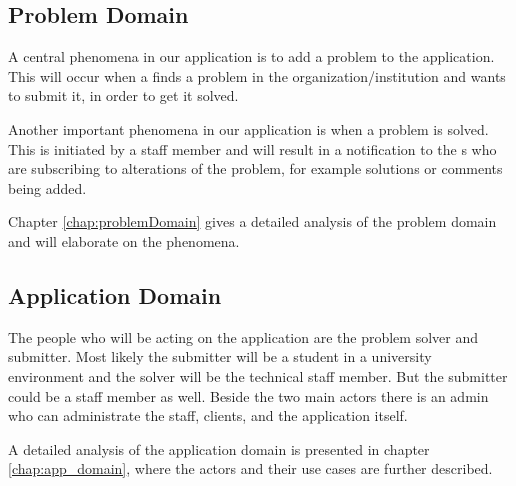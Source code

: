 \subsection{Problem Domain}
A central phenomena in our application is to add a problem to the application.
This will occur when a \aclient[] finds a problem in the organization/institution and wants to submit it, in order to get it solved.

Another important phenomena in our application is when a problem is solved.
This is initiated by a staff member and will result in a notification to the \aclient s who are subscribing to alterations of the problem, for example solutions or comments being added.

Chapter \ref{chap:problemDomain} gives a detailed analysis of the problem domain and will elaborate on the phenomena.

\subsection{Application Domain}
The people who will be acting on the application are the problem solver and submitter. Most likely the submitter will be a student in a university environment and the solver will be the technical staff member. But the submitter could be a staff member as well. Beside the two main actors there is an admin who can administrate the staff, clients, and the application itself.

A detailed analysis of the application domain is presented in chapter \ref{chap:app_domain}, where the actors and their use cases are further described.